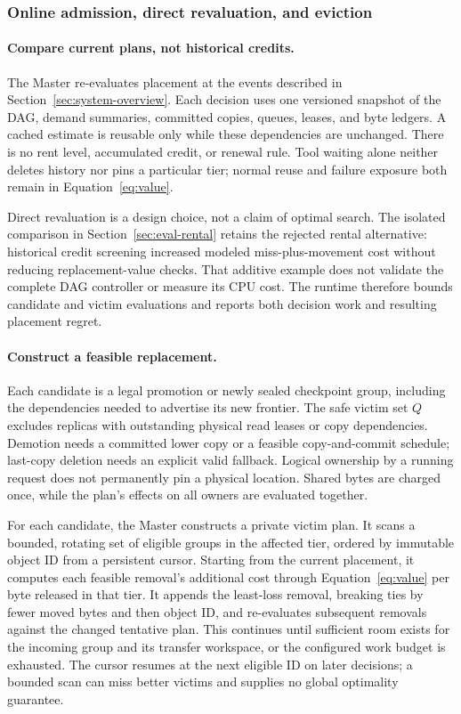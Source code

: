 \subsubsection{Online admission, direct revaluation, and eviction}
\label{sec:placement-plan}

\paragraph{Compare current plans, not historical credits.}
The Master re-evaluates placement at the events described in
Section~\ref{sec:system-overview}. Each decision uses one versioned snapshot
of the DAG, demand summaries, committed copies, queues, leases, and byte
ledgers. A cached estimate is reusable only while these dependencies are
unchanged. There is no rent level, accumulated credit, or renewal rule.
Tool waiting alone neither deletes history nor pins a particular tier;
normal reuse and failure exposure both remain in Equation~\ref{eq:value}.

Direct revaluation is a design choice, not a claim of optimal search.
The isolated comparison in Section~\ref{sec:eval-rental} retains the
rejected rental alternative: historical credit screening increased
modeled miss-plus-movement cost without reducing replacement-value checks.
That additive example does not validate the complete DAG controller or
measure its CPU cost. The runtime therefore bounds candidate and victim
evaluations and reports both decision work and resulting placement regret.

\paragraph{Construct a feasible replacement.}
Each candidate is a legal promotion or newly sealed checkpoint group,
including the dependencies needed to advertise its new frontier. The
safe victim set $Q$ excludes replicas with outstanding physical read
leases or copy dependencies. Demotion needs a committed lower copy or a
feasible copy-and-commit schedule; last-copy deletion needs an explicit
valid fallback. Logical ownership by a running request does not
permanently pin a physical location. Shared bytes are charged once, while
the plan's effects on all owners are evaluated together.

For each candidate, the Master constructs a private victim plan. It scans
a bounded, rotating set of eligible groups in the affected tier, ordered
by immutable object ID from a persistent cursor. Starting from the current
placement, it computes each feasible removal's additional cost through
Equation~\ref{eq:value} per byte released in that tier. It appends the
least-loss removal, breaking ties by fewer moved bytes and then object ID,
and re-evaluates subsequent removals against the changed tentative plan.
This continues until sufficient room exists for the incoming group and
its transfer workspace, or the configured work budget is exhausted.
The cursor resumes at the next eligible ID on later decisions; a bounded
scan can miss better victims and supplies no global optimality guarantee.


